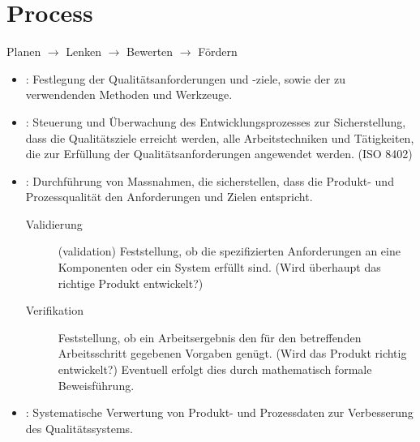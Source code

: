 \section{Process}
Planen $\longrightarrow$ Lenken $\longrightarrow$ Bewerten $\longrightarrow$
Fördern
\begin{itemize}
\item {}: Festlegung der Qualitätsanforderungen
 und -ziele, sowie der zu verwendenden Methoden und Werkzeuge.
\item {}: Steuerung und Überwachung des
  Entwicklungsprozesses
  zur Sicherstellung, dass die Qualitätsziele erreicht werden,
  alle Arbeitstechniken und Tä\-tig\-kei\-ten, die zur Erfüllung der
  Qualitätsanforderungen angewendet werden. (ISO 8402)
\ifslides
\newpage
\fi
\item {}: Durchführung von Massnahmen,
  die sicherstellen, dass die Produkt-
  und Prozessqualität den Anforderungen und Zielen entspricht.
  \begin{description}
  \item[Validierung] (validation) Feststellung, ob die spezifizierten
  Anforderungen an eine Komponenten oder ein System erfüllt sind.
  (Wird überhaupt das richtige Produkt entwickelt?)
\item[Verifikation] Feststellung, ob ein Arbeitsergebnis den für den
    betreffenden Arbeitsschritt gegebenen Vorgaben genügt.
    (Wird das Produkt richtig entwickelt?) Eventuell erfolgt dies durch
    mathematisch formale Beweisführung.
%
%
  \end{description}
\item {}: Systematische Verwertung von Produkt- und
  Prozessdaten zur Ver\-bes\-serung des Qualitätssystems.
\end{itemize}
\newpage
